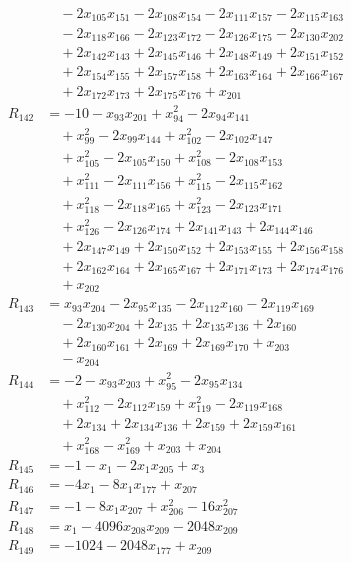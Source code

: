 \begin{align*}
&\quad{}-2x_{105}x_{151}-2x_{108}x_{154}-2x_{111}x_{157}-2x_{115}x_{163}\\
&\quad{}-2x_{118}x_{166}-2x_{123}x_{172}-2x_{126}x_{175}-2x_{130}x_{202}\\
&\quad{}+2x_{142}x_{143}+2x_{145}x_{146}+2x_{148}x_{149}+2x_{151}x_{152}\\
&\quad{}+2x_{154}x_{155}+2x_{157}x_{158}+2x_{163}x_{164}+2x_{166}x_{167}\\
&\quad{}+2x_{172}x_{173}+2x_{175}x_{176}+x_{201}\\
R_{142}&=-10-x_{93}x_{201}+x_{94}^{2}-2x_{94}x_{141}\\
&\quad{}+x_{99}^{2}-2x_{99}x_{144}+x_{102}^{2}-2x_{102}x_{147}\\
&\quad{}+x_{105}^{2}-2x_{105}x_{150}+x_{108}^{2}-2x_{108}x_{153}\\
&\quad{}+x_{111}^{2}-2x_{111}x_{156}+x_{115}^{2}-2x_{115}x_{162}\\
&\quad{}+x_{118}^{2}-2x_{118}x_{165}+x_{123}^{2}-2x_{123}x_{171}\\
&\quad{}+x_{126}^{2}-2x_{126}x_{174}+2x_{141}x_{143}+2x_{144}x_{146}\\
&\quad{}+2x_{147}x_{149}+2x_{150}x_{152}+2x_{153}x_{155}+2x_{156}x_{158}\\
&\quad{}+2x_{162}x_{164}+2x_{165}x_{167}+2x_{171}x_{173}+2x_{174}x_{176}\\
&\quad{}+x_{202}\\
R_{143}&=x_{93}x_{204}-2x_{95}x_{135}-2x_{112}x_{160}-2x_{119}x_{169}\\
&\quad{}-2x_{130}x_{204}+2x_{135}+2x_{135}x_{136}+2x_{160}\\
&\quad{}+2x_{160}x_{161}+2x_{169}+2x_{169}x_{170}+x_{203}\\
&\quad{}-x_{204}\\
R_{144}&=-2-x_{93}x_{203}+x_{95}^{2}-2x_{95}x_{134}\\
&\quad{}+x_{112}^{2}-2x_{112}x_{159}+x_{119}^{2}-2x_{119}x_{168}\\
&\quad{}+2x_{134}+2x_{134}x_{136}+2x_{159}+2x_{159}x_{161}\\
&\quad{}+x_{168}^{2}-x_{169}^{2}+x_{203}+x_{204}\\
R_{145}&=-1-x_{1}-2x_{1}x_{205}+x_{3}\\
R_{146}&=-4x_{1}-8x_{1}x_{177}+x_{207}\\
R_{147}&=-1-8x_{1}x_{207}+x_{206}^{2}-16x_{207}^{2}\\
R_{148}&=x_{1}-4096x_{208}x_{209}-2048x_{209}\\
R_{149}&=-1024-2048x_{177}+x_{209}\\
\end{align*}
\endgroup
